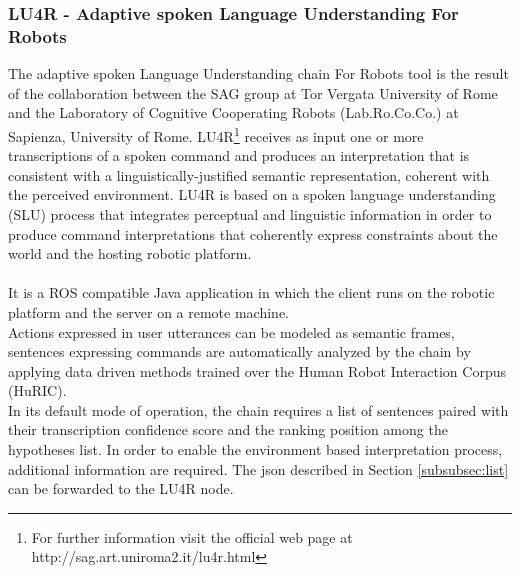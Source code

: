 \subsubsection*{LU4R - Adaptive spoken Language Understanding For Robots}
The adaptive spoken Language Understanding chain For Robots tool is the result of the collaboration between the SAG group at Tor Vergata University of Rome and the Laboratory of Cognitive Cooperating Robots (Lab.Ro.Co.Co.) at Sapienza, University of Rome. LU4R\footnote{For further information visit the official web page at http://sag.art.uniroma2.it/lu4r.html} receives as input one or more transcriptions of a spoken command and produces an interpretation that is consistent with a linguistically-justified semantic representation, coherent with the perceived environment. LU4R is based on a spoken language understanding (SLU) process that integrates perceptual and linguistic information in order to produce command interpretations that coherently express constraints about the world and the hosting robotic platform.\\
\\
It is a ROS compatible Java application in which the client runs on the robotic platform and the server on a remote machine.\\
Actions expressed in user utterances can be modeled as semantic frames, sentences expressing commands are automatically analyzed by the chain by applying data driven methods trained over the Human Robot Interaction Corpus (HuRIC)\cite{bib3}.
\\
In its default mode of operation, the chain requires a list of sentences paired with their transcription confidence score and the ranking position among the hypotheses list. In order to enable the environment based interpretation process, additional information are required. The json described in Section \ref{subsubsec:list} can be forwarded to the LU4R node.



